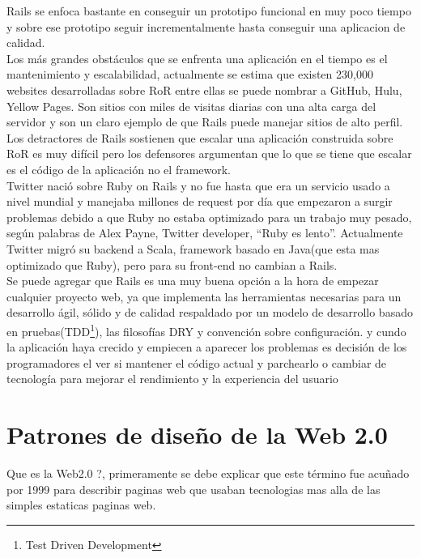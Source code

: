     Rails se enfoca bastante en conseguir un prototipo funcional en muy poco tiempo 
    y sobre ese prototipo seguir incrementalmente hasta conseguir una aplicacion 
    de calidad.\\

    Los más grandes obstáculos que se enfrenta una aplicación en el tiempo es el 
    mantenimiento y escalabilidad, actualmente se estima que existen 230,000 websites\cite{web2} 
    desarrolladas sobre RoR %
    entre ellas se puede nombrar a GitHub, Hulu, Yellow Pages. Son sitios con miles de visitas diarias
    con una alta carga del servidor y son un claro ejemplo de que Rails puede manejar sitios de alto perfil.\\

    Los detractores de Rails sostienen que escalar una aplicación construida 
    sobre RoR es muy difícil pero los defensores argumentan que lo que se 
    tiene que escalar es el código de la aplicación no el framework.\\

    Twitter nació sobre Ruby on  Rails  y no fue hasta que era un servicio usado 
    a nivel mundial y manejaba millones de request por día que empezaron a surgir 
    problemas debido a que Ruby no estaba optimizado para un trabajo muy pesado, 
    según palabras de Alex Payne, Twitter developer, “Ruby es lento”\cite{web3}. 
    Actualmente Twitter migró su backend a Scala, framework basado en Java(que esta mas optimizado que Ruby),
    pero para su front-end no cambian a Rails.\cite{web4}\\
    
    Se puede agregar que Rails es una muy buena opción a la hora de empezar 
    cualquier proyecto web, ya que implementa las herramientas necesarias 
    para un desarrollo ágil, sólido y de calidad respaldado por un modelo 
    de desarrollo basado en pruebas(TDD\footnote{Test Driven Development}), las filosofías DRY y convención sobre configuración.
    y cundo la aplicaci\'on haya crecido y empiecen a aparecer los problemas es 
    decisión de los programadores el ver si mantener el código actual y parchearlo o 
    cambiar de tecnología para mejorar el rendimiento y la experiencia del usuario\\

  \section{Patrones de diseño de la Web 2.0} %
  \label{sec:patrones_web20}
    Que es la Web2.0 ?,  primeramente  se debe explicar que este término fue acuñado 
    por 1999 para describir paginas web que usaban tecnologias mas alla de las 
    simples estaticas paginas web.\\
    
